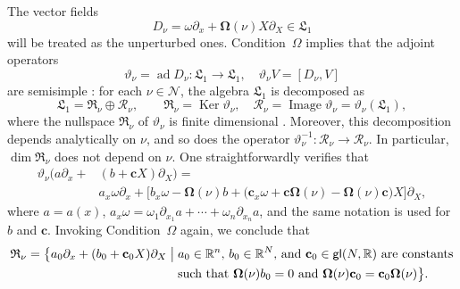 \documentclass[12pt,reqno]{amsart}
\theoremstyle{definition}
\begin{document}
The vector fields
\[
D_\nu=\omega\partial_x+{\mathbf{\Omega}}(\nu)X\partial_X\in{\mathfrak L}_1
\]
will be treated as the unperturbed ones. Condition~$\Omega$ implies that the
adjoint operators
\[
{\vartheta}_\nu=\operatorname{ad} D_\nu:{\mathfrak L}_1\to{\mathfrak L}_1, \quad {\vartheta}_\nu V=[D_\nu,V]
\]
are semisimple \cite[Section~2b)]{M67}: for each $\nu\in{\mathcal N}$, the algebra
${\mathfrak L}_1$ is decomposed as
\begin{equation}
{\mathfrak L}_1={\mathfrak R}_\nu\oplus{\mathcal R}_\nu, \qquad {\mathfrak R}_\nu=\operatorname{Ker}{\vartheta}_\nu, \quad
{\mathcal R}_\nu=\operatorname{Image}{\vartheta}_\nu={\vartheta}_\nu({\mathfrak L}_1),
\label{eqfRcR}
\end{equation}
where the nullspace ${\mathfrak R}_\nu$ of ${\vartheta}_\nu$ is finite dimensional
\cite[Section~2b)]{M67}. Moreover, this decomposition depends analytically on
$\nu$, and so does the operator ${\vartheta}_\nu^{-1}:{\mathcal R}_\nu\to{\mathcal R}_\nu$. In
particular, $\dim{\mathfrak R}_\nu$ does not depend on $\nu$. One straightforwardly
verifies that
\begin{align*}
{\vartheta}_\nu\bigl( a\partial_x+{} & (b+{\mathbf c} X)\partial_X \bigr) = {} \\
& a_x\omega\partial_x+\bigl[ b_x\omega-{\mathbf{\Omega}}(\nu)b +
\bigl({\mathbf c}_x\omega+{\mathbf c}{\mathbf{\Omega}}(\nu)-{\mathbf{\Omega}}(\nu){\mathbf c}\bigr)X \bigr]\partial_X,
\end{align*}
where $a=a(x)$,
$a_x\omega=\omega_1\partial_{x_1}a+\cdots+\omega_n\partial_{x_n}a$, and the
same notation is used for $b$ and ${\mathbf c}$. Invoking Condition~$\Omega$ again, we
conclude that \cite[Section~2b)]{M67}
\begin{equation}
\begin{aligned}
{\mathfrak R}_\nu=\bigl\{ a_0\partial_x+(b_0+{\mathbf c}_0X)\partial_X \bigm| {} &
\text{$a_0\in{\mathbb R}^n$, $b_0\in{\mathbb R}^N$, and ${\mathbf c}_0\in{\mathsf{gl}}(N,{\mathbb R})$ are constants} \\
& \text{such that ${\mathbf{\Omega}}(\nu)b_0=0$ and
${\mathbf{\Omega}}(\nu){\mathbf c}_0={\mathbf c}_0{\mathbf{\Omega}}(\nu)$} \bigr\}.
\end{aligned}
\label{eqKer}
\end{equation}
\end{document}
